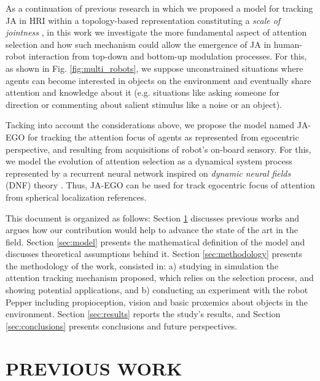\documentclass[letterpaper, 10 pt, conference]{ieeeconf}  %
\begin{document}
	As a continuation of previous research in which we proposed a model for tracking JA in HRI within a topology-based representation constituting a \textit{scale of jointness} \cite{chame2023top}, in this work we investigate the more fundamental aspect of attention selection and how such mechanism could allow the emergence of JA in human-robot interaction from top-down and bottom-up modulation processes. For this, as shown in Fig. \ref{fig:multi_robots}, we suppose unconstrained situations where agents can become interested in objects on the environment and eventually share attention and knowledge about it (e.g. situations like asking someone for direction or commenting about salient stimulus like a noise or an object). 
	
	Tacking into account the considerations above, we propose the model named JA-EGO for tracking the attention focus of agents as represented from egocentric perspective, and resulting from acquisitions of robot's on-board sensory. For this, we model the evolution of attention selection as a dynamical system process represented by a recurrent neural network inspired on \textit{dynamic neural fields} (DNF) theory \cite{amari1977}. Thus, JA-EGO can be used for track egocentric focus of attention from spherical localization references. 
	  	  
	This document is organized as follows: Section \ref{sec:previous} discusses previous works and argues how our contribution would help to advance the state of the art in the field. Section \ref{sec:model} presents the mathematical definition of the model and discusses theoretical assumptions behind it. Section \ref{sec:methodology} presents the methodology of the work, consisted in: a) studying in simulation the attention tracking mechanism proposed, which relies on the selection process, and showing potential applications, and b) conducting an experiment with the robot Pepper including propioception, vision and basic proxemics about objects in the environment. Section \ref{sec:results} reports the study’s results, and Section \ref{sec:conclusions} presents conclusions and future perspectives.
	  
	
	
	\section{PREVIOUS WORK}
	\label{sec:previous}
	
\end{document}
